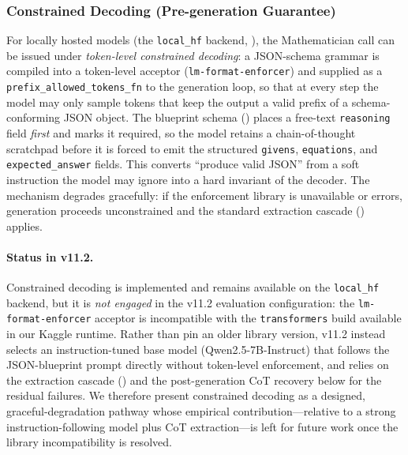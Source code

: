 \documentclass[11pt,a4paper]{article}
\begin{document}
\subsubsection{Constrained Decoding (Pre-generation Guarantee)}
For locally hosted models (the \texttt{local\_hf} backend, ), the Mathematician call can be issued under \emph{token-level constrained decoding}: a JSON-schema grammar is compiled into a token-level acceptor (\texttt{lm-format-enforcer}) and supplied as a \texttt{prefix\_allowed\_tokens\_fn} to the generation loop, so that at every step the model may only sample tokens that keep the output a valid prefix of a schema-conforming JSON object.
The blueprint schema () places a free-text \texttt{reasoning} field \emph{first} and marks it required, so the model retains a chain-of-thought scratchpad before it is forced to emit the structured \texttt{givens}, \texttt{equations}, and \texttt{expected\_answer} fields.
This converts ``produce valid JSON'' from a soft instruction the model may ignore into a hard invariant of the decoder.
The mechanism degrades gracefully: if the enforcement library is unavailable or errors, generation proceeds unconstrained and the standard extraction cascade () applies.
\paragraph{Status in v11.2.}
Constrained decoding is implemented and remains available on the \texttt{local\_hf} backend, but it is \emph{not engaged} in the v11.2 evaluation configuration: the \texttt{lm-format-enforcer} acceptor is incompatible with the \texttt{transformers} build available in our Kaggle runtime.
Rather than pin an older library version, v11.2 instead selects an instruction-tuned base model (Qwen2.5-7B-Instruct) that follows the JSON-blueprint prompt directly without token-level enforcement, and relies on the extraction cascade () and the post-generation CoT recovery below for the residual failures.
We therefore present constrained decoding as a designed, graceful-degradation pathway whose empirical contribution---relative to a strong instruction-following model plus CoT extraction---is left for future work once the library incompatibility is resolved.
\end{document}
